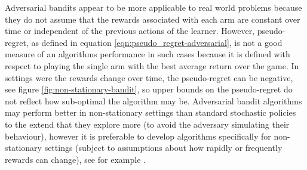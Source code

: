 \documentclass[11pt,a4paper,oneside]{book}
\theoremstyle{plain}
\theoremstyle{definition}
\begin{document}
Adversarial bandits appear to be more applicable to real world problems because they do not assume that the rewards associated with each arm are constant over time or independent of the previous actions of the learner. However, pseudo-regret, as defined in equation \ref{eqn:pseudo_regret-adversarial}, is not a good measure of an algorithms performance in such cases because it is defined with respect to playing the single arm with the best average return over the game. In settings were the rewards change over time, the pseudo-regret can be negative, see figure \ref{fig:non-stationary-bandit}, so upper bounds on the pseudo-regret do not reflect how sub-optimal the algorithm may be. Adversarial bandit algorithms may perform better in non-stationary settings than standard stochastic policies to the extend that they explore more (to avoid the adversary simulating their behaviour), however it is preferable to develop algorithms specifically for non-stationary settings (subject to assumptions about how rapidly or frequently rewards can change), see for example \citep{garivier2008upper,Garivier2011a,Besbes2014}. 
\end{document}
